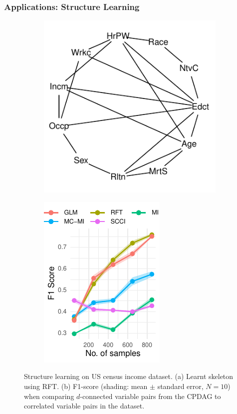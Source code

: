 \documentclass{beamer}
\begin{document}
\begin{frame}
	\frametitle{Applications: Structure Learning}
	\begin{figure}
		\centering
		\begin{subfigure}{0.5\textwidth}
			\centering
			\includegraphics[scale=0.85]{imgs/sl-adult-rf.pdf}
			\caption*{}
			\label{fig:sl_adult_model}
		\end{subfigure}%
		\begin{subfigure}{0.5\textwidth}
			\centering
			\includegraphics{imgs/adult_F1.pdf}
			\caption*{}
			\label{fig:sl_adult}
		\end{subfigure}
		\caption*{Structure learning on US census income dataset. (a)
		Learnt skeleton using RFT. (b) F1-score (shading: mean $\pm$
		standard error, $N=10$) when comparing $d$-connected variable
		pairs from the CPDAG to correlated variable pairs in the
		dataset.}
	\end{figure}
\end{frame}
\end{document}
